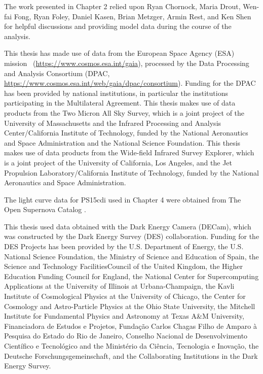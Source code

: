 The work presented in Chapter 2 relied upon Ryan Chornock, Maria Drout, Wen-fai Fong, Ryan Foley, Daniel Kasen, Brian Metzger, Armin Rest, and Ken Shen for helpful discussions and providing model data during the course of the analysis.

This thesis has made use of data from the European Space Agency (ESA) mission \gaia\ (\url{https://www.cosmos.esa.int/gaia}), processed by the \gaia Data Processing and Analysis Consortium (DPAC, \url{https://www.cosmos.esa.int/web/gaia/dpac/consortium}). Funding for the DPAC has been provided by national institutions, in particular the institutions participating in the \gaia Multilateral Agreement. This thesis makes use of data products from the Two Micron All Sky Survey, which is a joint project of the University of Massachusetts and the Infrared Processing and Analysis Center/California Institute of Technology, funded by the National Aeronautics and Space Administration and the National Science Foundation. This thesis makes use of data products from the Wide-field Infrared Survey Explorer, which is a joint project of the University of California, Los Angeles, and the Jet Propulsion Laboratory/California Institute of Technology, funded by the National Aeronautics and Space Administration.

The light curve data for PS15cdi used in Chapter 4 were obtained from The Open Supernova
Catalog \citep{Guillochon+17a}.

This thesis used data obtained with the Dark Energy Camera (DECam), which was constructed by the Dark Energy Survey (DES) collaboration. Funding for the DES Projects has been provided by the U.S. Department of Energy, the U.S. National Science Foundation, the Ministry of Science and Education of Spain, the Science and Technology FacilitiesCouncil of the United Kingdom, the Higher Education Funding Council for England, the National Center for Supercomputing Applications at the University of Illinois at Urbana-Champaign, the Kavli Institute of Cosmological Physics at the University of Chicago, the Center for Cosmology and Astro-Particle Physics at the Ohio State University, the Mitchell Institute for Fundamental Physics and Astronomy at Texas A\&M University, Financiadora de Estudos e Projetos, Funda{\c c}{\~a}o Carlos Chagas Filho de Amparo {\`a} Pesquisa do Estado do Rio de Janeiro, Conselho Nacional de Desenvolvimento Cient{\'i}fico e Tecnol{\'o}gico and the Minist{\'e}rio da Ci{\^e}ncia, Tecnologia e Inova{\c c}{\~a}o, the Deutsche Forschungsgemeinschaft, and the Collaborating Institutions in the Dark Energy Survey.

